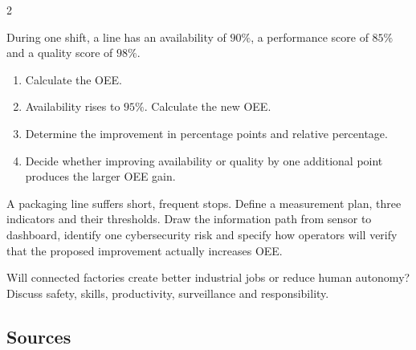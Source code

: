\begin{multicols}{2}
\begin{applicationexercise}
During one shift, a line has an availability of $90\%$, a performance score of $85\%$ and a quality
score of $98\%$.
\begin{enumerate}
\item Calculate the OEE.
\item Availability rises to $95\%$. Calculate the new OEE.
\item Determine the improvement in percentage points and relative percentage.
\item Decide whether improving availability or quality by one additional point produces the larger OEE gain.
\end{enumerate}
\end{applicationexercise}

\begin{engineeringchallenge}
A packaging line suffers short, frequent stops. Define a measurement plan, three indicators and their
thresholds. Draw the information path from sensor to dashboard, identify one cybersecurity risk and
specify how operators will verify that the proposed improvement actually increases OEE.
\end{engineeringchallenge}

\begin{speaking}
Will connected factories create better industrial jobs or reduce human autonomy? Discuss safety,
skills, productivity, surveillance and responsibility.
\end{speaking}
\end{multicols}

\subsection*{Sources}
